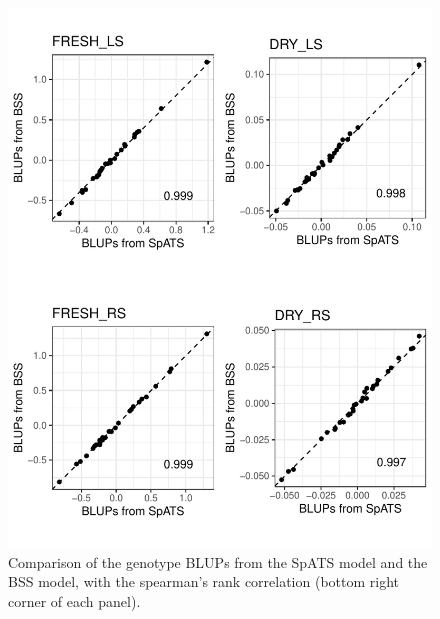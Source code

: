\begin{figure}
	\centering
	\includegraphics[width=\textwidth]{../../Figures/Genotype_Comparative_plots.pdf} 
	\caption[Comparison of the genotype BLUPs from the SpATS model and the BSS model]{Comparison of the genotype BLUPs from the SpATS model and the BSS model, with the spearman's rank correlation (bottom right corner of each panel).}
	\label{fig:genotype_comparison_BSS_SPATS}
\end{figure}

